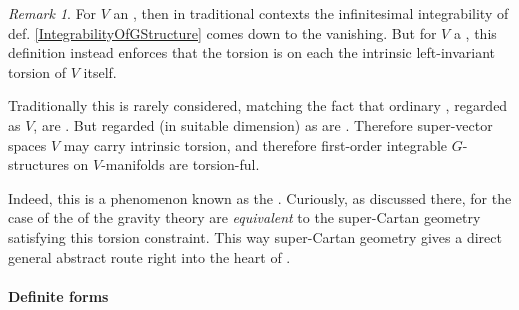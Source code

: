 \documentclass[12pt,titlepage]{article}
\theoremstyle{plain}
\theoremstyle{definition}
\theoremstyle{remark}
\newtheorem{remark}{Remark}
\begin{document}
\begin{remark}
\label{TorsionConstraints}\hypertarget{TorsionConstraints}{}
For $V$ an , then in traditional contexts the infinitesimal integrability of def. \ref{IntegrabilityOfGStructure} comes down to the  vanishing. But for $V$ a , this definition instead enforces that the torsion is on each  the intrinsic left-invariant torsion of $V$ itself.

Traditionally this is rarely considered, matching the fact that ordinary , regarded as  $V$, are . But  regarded (in suitable dimension) as  are \emph{}. Therefore super-vector spaces $V$ may carry intrinsic torsion, and therefore first-order integrable $G$-structures on $V$-manifolds are torsion-ful.

Indeed, this is a phenomenon known as the . Curiously, as discussed there, for the case of  the  of the gravity theory are \emph{equivalent} to the super-Cartan geometry satisfying this torsion constraint. This way super-Cartan geometry gives a direct general abstract route right into the heart of .

\end{remark}
\hypertarget{definite_forms}{}\paragraph*{{Definite forms}}\label{definite_forms}
\end{document}
